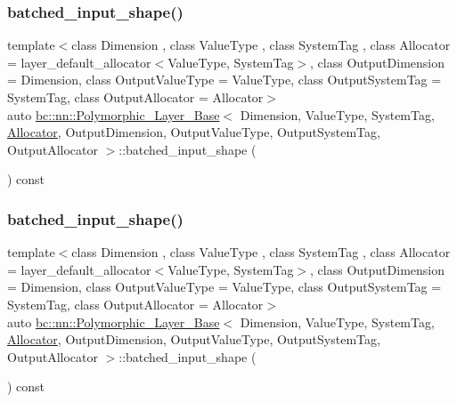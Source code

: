 \subsubsection{\texorpdfstring{batched\+\_\+input\+\_\+shape()}{batched\_input\_shape()}\hspace{0.1cm}{\footnotesize\ttfamily [1/2]}}
{\footnotesize\ttfamily template$<$class Dimension , class Value\+Type , class System\+Tag , class Allocator  = layer\+\_\+default\+\_\+allocator$<$\+Value\+Type, System\+Tag$>$, class Output\+Dimension  = Dimension, class Output\+Value\+Type  = Value\+Type, class Output\+System\+Tag  = System\+Tag, class Output\+Allocator  = Allocator$>$ \\
auto \hyperlink{structbc_1_1nn_1_1Polymorphic__Layer__Base}{bc\+::nn\+::\+Polymorphic\+\_\+\+Layer\+\_\+\+Base}$<$ Dimension, Value\+Type, System\+Tag, \hyperlink{classbc_1_1allocators_1_1Allocator}{Allocator}, Output\+Dimension, Output\+Value\+Type, Output\+System\+Tag, Output\+Allocator $>$\+::batched\+\_\+input\+\_\+shape (\begin{DoxyParamCaption}{ }\end{DoxyParamCaption}) const\hspace{0.3cm}{\ttfamily [inline]}}

\mbox{\label{structbc_1_1nn_1_1Polymorphic__Layer__Base_a362477a099ec16eeafcda0527ca711b2}} 
\subsubsection{\texorpdfstring{batched\+\_\+input\+\_\+shape()}{batched\_input\_shape()}\hspace{0.1cm}{\footnotesize\ttfamily [2/2]}}
{\footnotesize\ttfamily template$<$class Dimension , class Value\+Type , class System\+Tag , class Allocator  = layer\+\_\+default\+\_\+allocator$<$\+Value\+Type, System\+Tag$>$, class Output\+Dimension  = Dimension, class Output\+Value\+Type  = Value\+Type, class Output\+System\+Tag  = System\+Tag, class Output\+Allocator  = Allocator$>$ \\
auto \hyperlink{structbc_1_1nn_1_1Polymorphic__Layer__Base}{bc\+::nn\+::\+Polymorphic\+\_\+\+Layer\+\_\+\+Base}$<$ Dimension, Value\+Type, System\+Tag, \hyperlink{classbc_1_1allocators_1_1Allocator}{Allocator}, Output\+Dimension, Output\+Value\+Type, Output\+System\+Tag, Output\+Allocator $>$\+::batched\+\_\+input\+\_\+shape (\begin{DoxyParamCaption}{ }\end{DoxyParamCaption}) const\hspace{0.3cm}{\ttfamily [inline]}}

